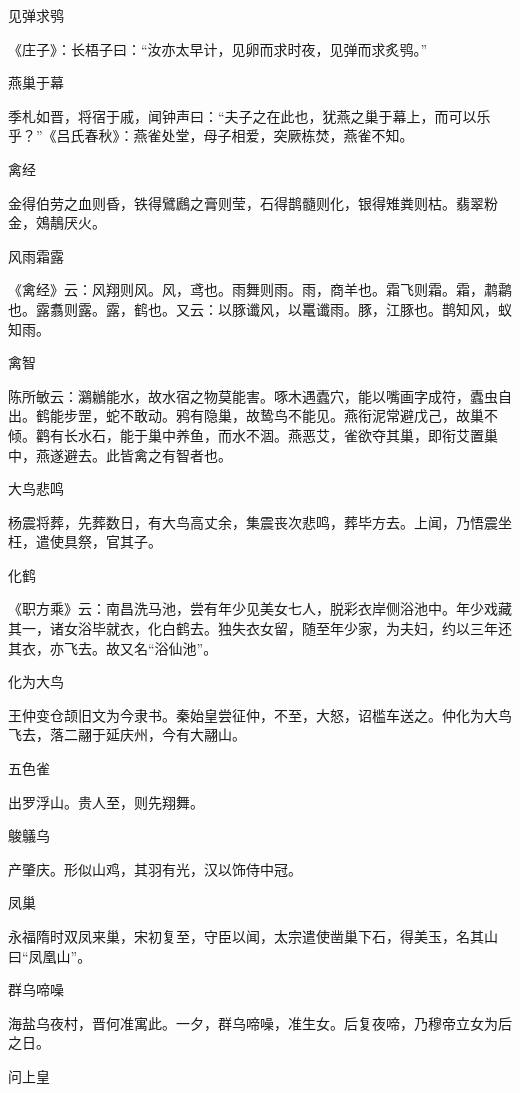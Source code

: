 \documentclass[a4paper,12pt,UTF8,twoside]{ctexbook}
\begin{document}
    见弹求鸮
    
    《庄子》：长梧子曰：“汝亦太早计，见卵而求时夜，见弹而求炙鸮。”
    
    燕巢于幕
    
    季札如晋，将宿于戚，闻钟声曰：“夫子之在此也，犹燕之巢于幕上，而可以乐乎？”《吕氏春秋》：燕雀处堂，母子相爱，突厥栋焚，燕雀不知。
    
    禽经
    
    金得伯劳之血则昏，铁得鷿鷉之膏则莹，石得鹊髓则化，银得雉粪则枯。翡翠粉金，鵁鶄厌火。
    
    风雨霜露
    
    《禽经》云：风翔则风。风，鸢也。雨舞则雨。雨，商羊也。霜飞则霜。霜，鹔鹴也。露翥则露。露，鹤也。又云：以豚谶风，以鼍谶雨。豚，江豚也。鹊知风，蚁知雨。
    
    禽智
    
    陈所敏云：鸂鶒能水，故水宿之物莫能害。啄木遇蠹穴，能以嘴画字成符，蠹虫自出。鹤能步罡，蛇不敢动。鸦有隐巢，故鸷鸟不能见。燕衔泥常避戊己，故巢不倾。鹳有长水石，能于巢中养鱼，而水不涸。燕恶艾，雀欲夺其巢，即衔艾置巢中，燕遂避去。此皆禽之有智者也。
    
    大鸟悲鸣
    
    杨震将葬，先葬数日，有大鸟高丈余，集震丧次悲鸣，葬毕方去。上闻，乃悟震坐枉，遣使具祭，官其子。
    
    化鹤
    
    《职方乘》云：南昌洗马池，尝有年少见美女七人，脱彩衣岸侧浴池中。年少戏藏其一，诸女浴毕就衣，化白鹤去。独失衣女留，随至年少家，为夫妇，约以三年还其衣，亦飞去。故又名“浴仙池”。
    
    化为大鸟
    
    王仲变仓颉旧文为今隶书。秦始皇尝征仲，不至，大怒，诏槛车送之。仲化为大鸟飞去，落二翮于延庆州，今有大翮山。
    
    五色雀
    
    出罗浮山。贵人至，则先翔舞。
    
    鵔鸃乌
    
    产肇庆。形似山鸡，其羽有光，汉以饰侍中冠。
    
    凤巢
    
    永福隋时双凤来巢，宋初复至，守臣以闻，太宗遣使凿巢下石，得美玉，名其山曰“凤凰山”。
    
    群乌啼噪
    
    海盐乌夜村，晋何准寓此。一夕，群乌啼噪，准生女。后复夜啼，乃穆帝立女为后之日。
    
    问上皇
    
\end{document}
